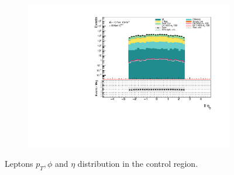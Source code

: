 \documentclass[12pt, a4paper]{book}
\begin{document}
\begin{figure}[!ht]
\begin{subfigure}[b]{0.49\textwidth}
        \includegraphics[width=\textwidth]{eta2_ll.pdf}
    \end{subfigure}
    \caption{Leptons $p_T, \phi$ and $\eta$ distribution in the control region.}
\end{figure}
\end{document}
